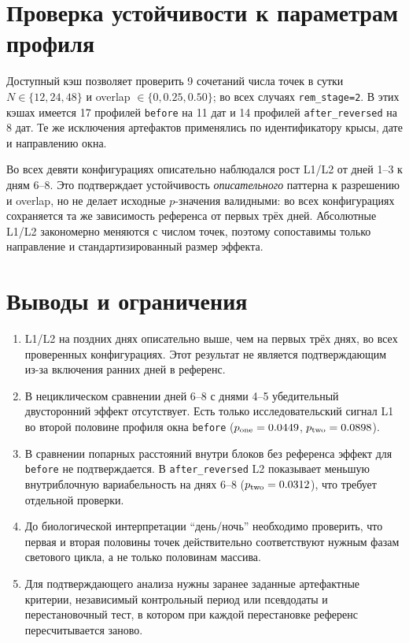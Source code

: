 \documentclass[11pt,a4paper]{article}
\begin{document}
\section{Проверка устойчивости к параметрам профиля}
Доступный кэш позволяет проверить 9 сочетаний числа точек в сутки
$N\in\{12,24,48\}$ и overlap $\in\{0,0.25,0.50\}$; во всех случаях
\texttt{rem\_stage=2}. В этих кэшах имеется 17 профилей \texttt{before}
на 11 дат и 14 профилей \texttt{after\_reversed} на 8 дат. Те же исключения
артефактов применялись по идентификатору крысы, дате и направлению окна.

Во всех девяти конфигурациях описательно наблюдался рост L1/L2 от дней 1--3
к дням 6--8. Это подтверждает устойчивость \emph{описательного} паттерна к
разрешению и overlap, но не делает исходные $p$-значения валидными: во всех
конфигурациях сохраняется та же зависимость референса от первых трёх дней.
Абсолютные L1/L2 закономерно меняются с числом точек, поэтому сопоставимы
только направление и стандартизированный размер эффекта.

\section{Выводы и ограничения}
\begin{enumerate}
  \item L1/L2 на поздних днях описательно выше, чем на первых трёх днях,
  во всех проверенных конфигурациях. Этот результат не является
  подтверждающим из-за включения ранних дней в референс.
  \item В нециклическом сравнении дней 6--8 с днями 4--5 убедительный
  двусторонний эффект отсутствует. Есть только исследовательский сигнал L1
  во второй половине профиля окна \texttt{before}
  ($p_{\rm one}=0.0449$, $p_{\rm two}=0.0898$).
  \item В сравнении попарных расстояний внутри блоков без референса эффект
  для \texttt{before} не подтверждается. В \texttt{after\_reversed} L2
  показывает меньшую внутриблочную вариабельность на днях 6--8
  ($p_{\rm two}=0.0312$), что требует отдельной проверки.
  \item До биологической интерпретации ``день/ночь'' необходимо проверить,
  что первая и вторая половины точек действительно соответствуют нужным
  фазам светового цикла, а не только половинам массива.
  \item Для подтверждающего анализа нужны заранее заданные артефактные
  критерии, независимый контрольный период или псевдодаты и перестановочный
  тест, в котором при каждой перестановке референс пересчитывается заново.
\end{enumerate}
\end{document}
